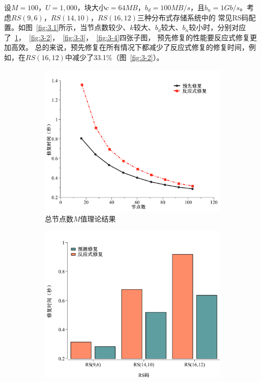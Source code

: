 设$M=100$，$U=1,000$，块大小$c=64MB$，$b_d=100MB/s$，且$b_n=1Gb/s$。考虑$RS(9,6)$，$RS(14,10)$，$RS(16,12)$三种分布式存储系统中的
常见RS码配置。如图~\ref{fig:3.1}所示，当节点数较少、$k$较大、$b_d$较大、$b_n$较小时，分别对应了~\ref{fig:3-1}，~\ref{fig:3-2}，~\ref{fig:3-3}，~\ref{fig:3-4}四张子图，
预先修复的性能要反应式修复更加高效。
总的来说，预先修复在所有情况下都减少了反应式修复的修复时间，例如，在$RS(16, 12)$中减少了33.1\%（图~\ref{fig:3-2}）。


\begin{figure}[htbp]
	\centering
	\begin{subfigure}[t]{0.4\textwidth}
		\centering
		\includegraphics[width=1.1\linewidth]{figures/3-1.pdf}
		\caption{总节点数$M$值理论结果}
		\label{fig:3-1}
	\end{subfigure}
	\begin{subfigure}[t]{0.4\textwidth}
		\centering
		\includegraphics[width=1.2\linewidth]{figures/3-2.pdf}

\end{subfigure}
\end{figure}
